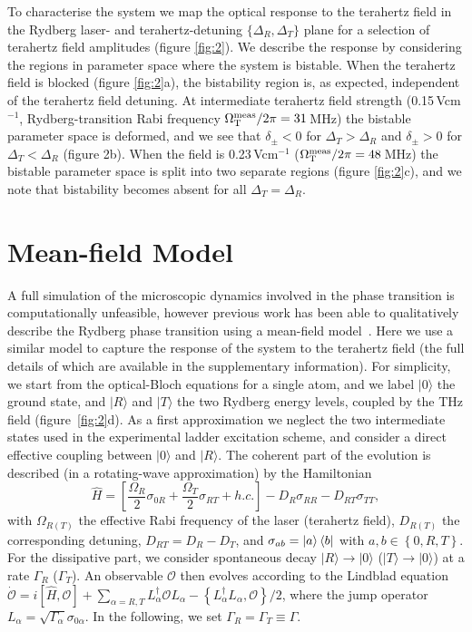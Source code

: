\documentclass[twocolumn,aps,prl,nobibnotes,8pt]{revtex4-1}
\newcommand{\ket}[1]{\ensuremath{\vert{#1}\rangle}}
\newcommand{\comm}[2]{\left[ #1,#2 \right]}
\newcommand{\acomm}[2]{\left\{ #1,#2 \right\}}
\newcommand{\be}{\begin{equation}}
\newcommand{\ee}{\end{equation}}
\newcommand{\mal}{\mathcal}
\newcommand{\lqq}{\left[}
\newcommand{\rqq}{\right]}
\newcommand{\rind}{R}
\newcommand{\tind}{T}
\begin{document}
To characterise the system we map the optical response to the terahertz field in the Rydberg laser- and terahertz-detuning $\{\Delta_R ,\Delta_T\}$ plane for a selection of terahertz field amplitudes (figure \ref{fig:2}).
We describe the response by considering the regions in parameter space where the system is bistable.
When the terahertz field is blocked (figure \ref{fig:2}a), the bistability region is, as expected, independent of the terahertz field detuning.
At intermediate terahertz field strength (0.15\,Vcm$^{-1}$, Rydberg-transition Rabi frequency $\Omega^{\rm{meas}}_{\rm{T}}/2\pi = 31$\,MHz) the bistable parameter space is deformed, and we see that $\delta_{\pm} < 0$ for $\Delta_T > \Delta_R$ and $\delta_{\pm} > 0$ for $\Delta_T < \Delta_R$ (figure 2b). 
When the field is 0.23\,Vcm$^{-1}$ ($\Omega^{\rm{meas}}_{\rm{T}}/2\pi = 48$\,MHz) the bistable parameter space is split into two separate regions (figure \ref{fig:2}c), and we note that bistability becomes absent for all $\Delta_T = \Delta_R$.

\section{Mean-field Model}
\label{Model}

\noindent
A full simulation of the microscopic dynamics involved in the phase transition is computationally unfeasible, however previous work has been able to qualitatively describe the Rydberg phase transition using a mean-field model~\cite{Carr13,deMelo16}. 
Here we use a similar model to capture the response of the system to the terahertz field (the full details of which are available in the supplementary information).
For simplicity, we start from the optical-Bloch equations for a single atom, and we label $\ket{0}$ the ground state, and $\ket{\rind}$ and $\ket{\tind}$ the two Rydberg energy levels, coupled by the THz field (figure~\ref{fig:2}d). 
As a first approximation we neglect the two intermediate states used in the experimental ladder excitation scheme, and consider a direct effective coupling between $\ket{0}$ and $\ket{\rind}$. 
The coherent part of the evolution is described (in a rotating-wave approximation) by the Hamiltonian 
\be 
	\hat{H} =         \lqq \frac{\Omega_{\rind}}{2} \sigma_{0\rind}  +\frac{\Omega_{\tind}}{2} \sigma_{\rind \tind} + h.c. \rqq -   D_{\rind} \sigma_{\rind \rind} - D_{\rind \tind}  \sigma_{\tind\tind}   ,
	\label{eq:H0}
\ee
with $\Omega_{\rind(\tind)}$ the effective Rabi frequency of the laser (terahertz field), $D_{\rind(\tind)}$ the corresponding detuning, $D_{\rind \tind} = D_\rind - D_\tind$, and $\sigma_{ab} = \ket{a} \bra{b}$ with $a,b \in \left\{ 0,\rind, \tind \right\}$. 
For the dissipative part, we consider spontaneous decay $\ket{\rind} \to \ket{0}$ ($\ket{\tind} \to \ket{0}$) at a rate $\Gamma_\rind$ ($\Gamma_\tind$). 
An observable $\mal{O}$ then evolves according to the Lindblad equation $\dot{\mal{O}} = i\comm{\hat{H}}{\mal{O}} + \sum_{\alpha = \rind, \tind} L_\alpha^\dag \mal{O} L_\alpha - \acomm{L_\alpha^\dag L_\alpha}{\mal{O}}/2$, where the jump operator $L_\alpha = \sqrt{\Gamma_\alpha} \sigma_{0\alpha}$.
In the following, we set $\Gamma_\rind = \Gamma_\tind \equiv \Gamma$.
\end{document}
